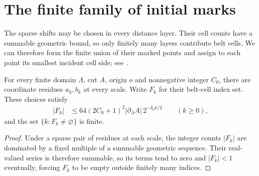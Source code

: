 \section{The finite family of initial marks}
\label{sec:area_law_initial_mark_family}

The sparse shifts may be chosen in every distance layer. Their cell counts
have a summable geometric bound, so only finitely many layers contribute
belt cells. We can therefore form the finite union of their marked
points and assign to each point its smallest incident cell side; see
\cite[Section~11]{OpenAI2026AreaLaw}.


\begin{lemma}
    \label{thm:area_law_finite_sparse_belt_family}
    \leanok
    For every finite domain $\Lambda$, cut $A$, origin $o$ and
    nonnegative integer $C_0$, there are coordinate residues $a_k,b_k$
    at every scale. Write $F_k$ for their belt-cell index set.
    These choices satisfy
    \begin{align}
        |F_k| & \le64(2C_0+1)^2|\partial_\Lambda A|\,2^{-\delta_0 k/2}
        \qquad(k\ge0),
    \end{align}
    and the set $\{k:F_k\ne\varnothing\}$ is finite.
\end{lemma}
\begin{proof}\leanok
    Under a sparse pair of residues at each scale, the integer counts
    $|F_k|$ are dominated by a fixed multiple of a summable geometric
    sequence. Their real-valued series is therefore summable, so its
    terms tend to zero and $|F_k|<1$ eventually, forcing $F_k$ to be
    empty outside finitely many indices.
\end{proof}

